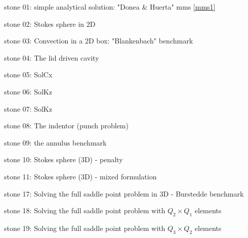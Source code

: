 

{\small 

\noindent stone 01: simple analytical solution: "Donea \& Huerta" mms \ref{mms1} 


\noindent stone 02: Stokes sphere in 2D 


\noindent stone 03: Convection in a 2D box: "Blankenbach" benchmark \cite{blbc89}


\noindent stone 04: The lid driven cavity


\noindent stone 05: SolCx


\noindent stone 06: SolKz


\noindent stone 07: SolKz


\noindent stone 08: The indentor (punch problem) 


\noindent stone 09: the annulus benchmark 


\noindent stone 10: Stokes sphere (3D) - penalty


\noindent stone 11: Stokes sphere (3D) - mixed formulation


\noindent stone 17: Solving the full saddle point problem in 3D - Burstedde benchmark \cite{dobo04} 


\noindent stone 18: Solving the full saddle point problem with $Q_2\times Q_1$ elements 


\noindent stone 19: Solving the full saddle point problem with $Q_3\times Q_2$ elements 


}
